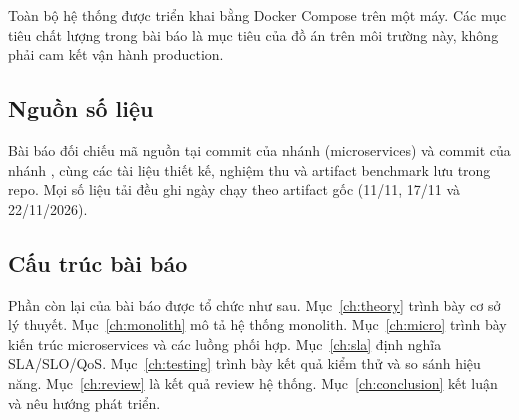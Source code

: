 Toàn bộ hệ thống được triển khai bằng Docker Compose trên một máy. Các mục tiêu chất lượng trong bài báo là mục tiêu của đồ án trên môi trường này, không phải cam kết vận hành production.

\subsection{Nguồn số liệu}

Bài báo đối chiếu mã nguồn tại commit \commitmain{} của nhánh  (microservices) và commit \commitmono{} của nhánh , cùng các tài liệu thiết kế, nghiệm thu và artifact benchmark lưu trong repo. Mọi số liệu tải đều ghi ngày chạy theo artifact gốc (11/11, 17/11 và 22/11/2026).

\subsection{Cấu trúc bài báo}

Phần còn lại của bài báo được tổ chức như sau. Mục~\ref{ch:theory} trình bày cơ sở lý thuyết. Mục~\ref{ch:monolith} mô tả hệ thống monolith. Mục~\ref{ch:micro} trình bày kiến trúc microservices và các luồng phối hợp. Mục~\ref{ch:sla} định nghĩa SLA/SLO/QoS. Mục~\ref{ch:testing} trình bày kết quả kiểm thử và so sánh hiệu năng. Mục~\ref{ch:review} là kết quả review hệ thống. Mục~\ref{ch:conclusion} kết luận và nêu hướng phát triển.

